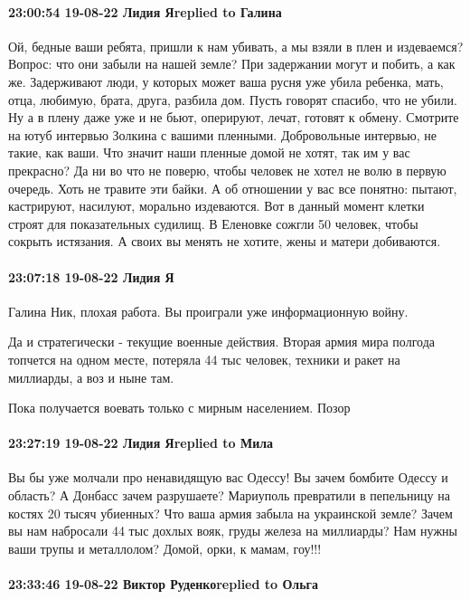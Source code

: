 \paragraph{23:00:54 19-08-22 Лидия Яreplied to Галина}

Ой, бедные ваши ребята, пришли к нам убивать, а мы взяли в плен и издеваемся?
Вопрос: что они забыли на нашей земле? При задержании могут и побить, а как же.
Задерживают люди, у которых может ваша русня уже убила ребенка, мать, отца,
любимую, брата, друга, разбила дом. Пусть говорят спасибо, что не убили. Ну а в
плену даже уже и не бьют, оперируют, лечат, готовят к обмену. Смотрите на ютуб
интервью Золкина с вашими пленными. Добровольные интервью, не такие, как ваши.
Что значит наши пленные домой не хотят, так им у вас прекрасно? Да ни во что не
поверю, чтобы человек не хотел не волю в первую очередь. Хоть не травите эти
байки. А об отношении у вас все понятно: пытают, кастрируют, насилуют, морально
издеваются. Вот в данный момент клетки строят для показательных судилищ. В
Еленовке сожгли 50 человек, чтобы сокрыть истязания. А своих вы менять не
хотите, жены и матери добиваются.

\paragraph{23:07:18 19-08-22 Лидия Я}

Галина Ник, плохая работа. Вы проиграли уже информационную войну. 

Да и стратегически - текущие военные действия. Вторая армия мира полгода топчется на одном месте, потеряла 44 тыс человек, техники и ракет на миллиарды, а воз и ныне там. 

Пока получается воевать только с мирным населением. Позор


\paragraph{23:27:19 19-08-22 Лидия Яreplied to Мила}

Вы бы уже молчали про ненавидящую вас Одессу! Вы зачем бомбите Одессу и
область? А Донбасс зачем разрушаете? Мариуполь превратили в пепельницу на
костях 20 тысяч убиенных? Что ваша армия забыла на украинской земле? Зачем вы
нам набросали 44 тыс дохлых вояк, груды железа на миллиарды? Нам нужны ваши
трупы и металлолом? Домой, орки, к мамам, гоу!!!

\paragraph{23:33:46 19-08-22 Виктор Руденкоreplied to Ольга}

